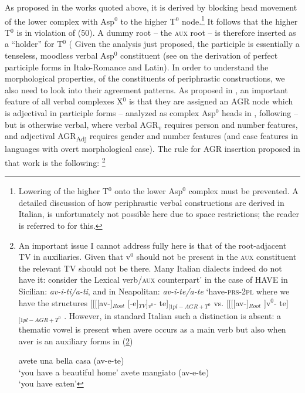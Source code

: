 \documentclass[output=paper]{langscibook}
\begin{document}
As proposed in the works quoted above, it is derived by blocking head movement of the lower complex with Asp$^0$ to the higher T$^0$ node.\footnote{Lowering of the higher T$^0$ onto the lower Asp$^0$ complex must be prevented. A detailed discussion of how periphrastic verbal constructions are derived in Italian, is unfortunately not possible here due to space restrictions; the reader is referred to \cite{calabrese2019a} for this.} It follows that the higher T$^0$ is in violation of (50).  A dummy root -- the \textsc{aux} root -- is therefore inserted as a “holder” for T$^0$ (\cite{bjorkman2011a} Given the analysis just proposed, the participle is essentially a tenseless, moodless verbal Asp$^0$ constituent (see \cite{calabrese2020a} on the derivation of perfect participle forms in Italo-Romance and Latin).  
 In order to understand the morphological properties, of the constituents of periphrastic constructions, we also need to look into their agreement patterns.  As proposed in \cite{calabrese2019a}, an important feature of all verbal complexes X$^0$ is that they are assigned an AGR node which is adjectival in participle forms --  analyzed as complex Asp$^0$ heads in \cite{calabrese2019a}, following \cite{embick2000a, embick2004a} --  but is otherwise verbal, where verbal AGR$_v$ requires person and number features, and adjectival AGR\textsubscript{Adj} requires gender and number features (and case features in languages with overt morphological case). The rule for AGR insertion proposed in that work is the following: \footnote{An important issue I cannot address fully here is that of the root-adjacent TV in auxiliaries.  Given that v$^0$ should not be present in the \textsc{aux} constituent the relevant TV should not be there.  Many Italian dialects indeed do not have it: consider the  Lexical verb\slash \textsc{aux} counterpart’ in the case of HAVE in Sicilian: \textit{av-i-ti/a-ti}, and  in Neapolitan: \textit{av-i-te/a-te} ‘have-\textsc{prs}-\textsc{2pl} where we have the structures [[[[av-]$_{Root}$ [-e]$_{TV}$]$_{v^0}$- te]$_{[1pl-AGR+T^0}$  vs. [[[[av-]$_{Root}$ ]v$^0$- te]$_{[1pl-AGR+T^0}$ . However, in standard Italian such a distinction is absent: a thematic vowel is present when avere occurs as a main verb but also when aver is an auxiliary forms in (\ref{fn38exb})
 
 \ea \label{fn38ex}
    \ea \label{fn38exa}avete una bella casa (av-e-te)\\
   ‘you have a beautiful home’
    \ex \label{fn38exb}avete mangiato (av-e-te)\\
   ‘you have eaten’
    \z
 \z
 
}
\end{document}
